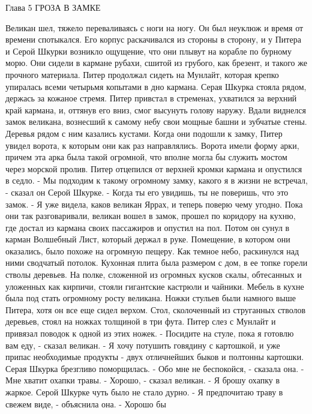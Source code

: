  Глава 5
        ГРОЗА В ЗАМКЕ

     Великан шел, тяжело переваливаясь с ноги на ногу. Он был неуклюж 
и время от времени спотыкался. Его корпус раскачивался из стороны в 
сторону, и у Питера и Серой Шкурки возникло ощущение, что они плывут 
на корабле по бурному морю. Они сидели в кармане рубахи, сшитой из 
грубого, как брезент, и такого же прочного материала.
    Питер продолжал сидеть на Мунлайт, которая крепко упиралась всеми 
четырьмя копытами в дно кармана. Серая Шкурка стояла рядом, держась за 
кожаное стремя.
    Питер привстал в стременах, ухватился за верхний край кармана, и, 
оттянув его вниз, смог высунуть голову наружу. Вдали виднелся замок 
великана, вознесший к самому небу свои мощные башни и зубчатые стены. 
Деревья рядом с ним казались кустами.
    Когда они подошли к замку, Питер увидел ворота, к которым они как 
раз направлялись. Ворота имели форму арки, причем эта арка была такой 
огромной, что вполне могла бы служить мостом через морской пролив.
    Питер отцепился от верхней кромки кармана и опустился в седло.
    - Мы подходим к такому огромному замку, какого я в жизни не 
встречал, - сказал он Серой Шкурке. - Когда ты его увидишь, ты не 
поверишь, что это замок.
    - Я уже видела, каков великан Яррах, и теперь поверю чему угодно.
    Пока они так разговаривали, великан вошел в замок, прошел по 
коридору на кухню, где достал из кармана своих пассажиров и опустил на 
пол. Потом он сунул в карман Волшебный Лист, который держал в руке.
    Помещение, в котором они оказались, было похоже на огромную 
пещеру. Как темное небо, раскинулся над ними сводчатый потолок. 
Кухонная плита была размером с дом, в ее топке горели стволы деревьев. 
На полке, сложенной из огромных кусков скалы, обтесанных и уложенных 
как кирпичи, стояли гигантские кастрюли и чайники.
    Мебель в кухне была под стать огромному росту великана. Ножки 
стульев были намного выше Питера, хотя он все еще сидел верхом. Стол, 
сколоченный из струганных стволов деревьев, стоял на ножках толщиной в 
три фута.
    Питер слез с Мунлайт и привязал поводок к одной из этих ножек.
    - Посидите на стуле, пока я готовлю вам еду, - сказал великан. - Я 
хочу потушить говядину с картошкой, и уже припас необходимые продукты 
- двух отличнейших быков и полтонны картошки.
    Серая Шкурка брезгливо поморщилась.
    - Обо мне не беспокойся, - сказала она. - Мне хватит охапки травы.
    - Хорошо, - сказал великан. - Я брошу охапку в жаркое.
    Серой Шкурке чуть было не стало дурно.
    - Я предпочитаю траву в свежем виде, - объяснила она. - Хорошо бы 
